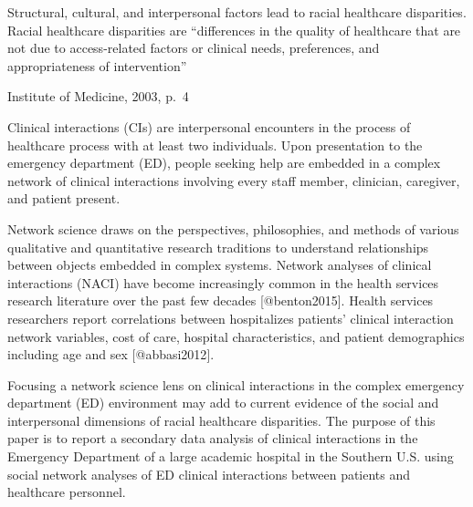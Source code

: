 \documentclass[
]{article}
\begin{document}
Structural, cultural, and interpersonal factors lead to racial
healthcare disparities. Racial healthcare disparities are ``differences
in the quality of healthcare that are not due to access-related factors
or clinical needs, preferences, and appropriateness of intervention''

Institute of Medicine, 2003, p.~4

Clinical interactions (CIs) are interpersonal encounters in the process
of healthcare process with at least two individuals. Upon presentation
to the emergency department (ED), people seeking help are embedded in a
complex network of clinical interactions involving every staff member,
clinician, caregiver, and patient present.

Network science draws on the perspectives, philosophies, and methods of
various qualitative and quantitative research traditions to understand
relationships between objects embedded in complex systems. Network
analyses of clinical interactions (NACI) have become increasingly common
in the health services research literature over the past few decades
{[}@benton2015{]}. Health services researchers report correlations
between hospitalizes patients' clinical interaction network variables,
cost of care, hospital characteristics, and patient demographics
including age and sex {[}@abbasi2012{]}.

Focusing a network science lens on clinical interactions in the complex
emergency department (ED) environment may add to current evidence of the
social and interpersonal dimensions of racial healthcare disparities.
The purpose of this paper is to report a secondary data analysis of
clinical interactions in the Emergency Department of a large academic
hospital in the Southern U.S. using social network analyses of ED
clinical interactions between patients and healthcare personnel.
\end{document}

